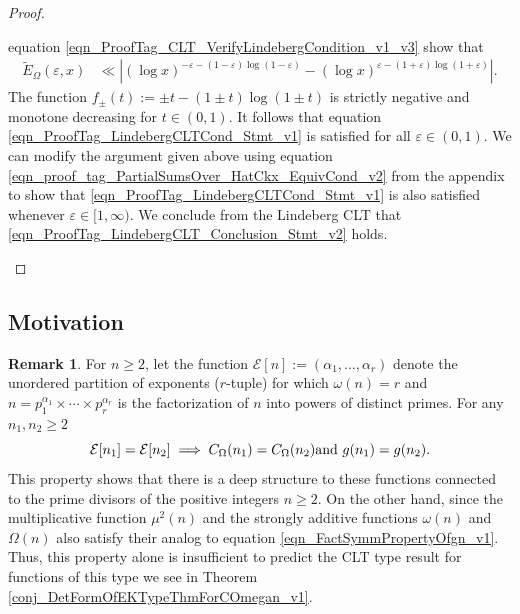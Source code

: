 \documentclass[11pt,reqno,a4letter]{article}
\newcommand{\hlocalref}[1]{\hyperref[#1]{\ref{#1}}}
\numberwithin{equation}{section}
\numberwithin{figure}{section}
\numberwithin{table}{section}
\theoremstyle{plain}
\numberwithin{theorem}{section}
\theoremstyle{definition}
\newtheorem{remark}[theorem]{Remark}
\theoremstyle{remark}
\newcommand{\mathtext}[1]{\text{\rm #1}}
\begin{document}
\begin{proof}
\begin{itemize}
equation \eqref{eqn_ProofTag_CLT_VerifyLindebergCondition_v1_v3} show that 
\begin{align*}
\widetilde{E}_{\Omega}(\varepsilon, x) & \ll 
      \left\lvert (\log x)^{-\varepsilon-(1-\varepsilon) \log(1-\varepsilon)} - 
      (\log x)^{\varepsilon-(1+\varepsilon) \log(1+\varepsilon)} \right\rvert. 
\end{align*}
The function $f_{\pm}(t) := \pm t - (1 \pm t) \log(1 \pm t)$ is strictly negative and 
monotone decreasing for $t \in (0, 1)$. 
It follows that equation \eqref{eqn_ProofTag_LindebergCLTCond_Stmt_v1} 
is satisfied for all $\varepsilon \in (0, 1)$. 
We can modify the argument given above using equation \eqref{eqn_proof_tag_PartialSumsOver_HatCkx_EquivCond_v2} 
from the appendix to show that 
\eqref{eqn_ProofTag_LindebergCLTCond_Stmt_v1} is also satisfied 
whenever $\varepsilon \in [1, \infty)$. 
We conclude from the Lindeberg CLT that 
\eqref{eqn_ProofTag_LindebergCLT_Conclusion_Stmt_v2} holds. 
\qedhere
\end{itemize}
\end{proof}

\subsection{Motivation}

\begin{remark}
\label{remark_COmegaFuncDistIntutitionFromErdosKac_v1}
For $n \geq 2$, let the function 
$\mathcal{E}[n] := (\alpha_1, \ldots, \alpha_r)$ denote the unordered 
partition of exponents ($r$-tuple) for which $\omega(n) = r$ and 
$n = p_1^{\alpha_1} \times \cdots \times p_r^{\alpha_r}$ is the factorization of 
$n$ into powers of distinct primes. 
For any $n_1,n_2 \geq 2$ 
\begin{equation}
\label{eqn_FactSymmPropertyOfgn_v1} 
\mathcal{E}[n_1] = \mathcal{E}[n_2] \implies C_{\Omega}(n_1) = C_{\Omega}(n_2) \mathtext{ and } 
	g(n_1) = g(n_2). 
\end{equation}
This property shows that there is a deep structure to these functions connected to the 
prime divisors of the positive integers $n \geq 2$. 
On the other hand, since the multiplicative function $\mu^2(n)$ and the 
strongly additive functions $\omega(n)$ and $\Omega(n)$ also satisfy their 
analog to equation \eqref{eqn_FactSymmPropertyOfgn_v1}. Thus, 
this property alone is insufficient to predict the CLT type 
result for functions of this type we see in 
Theorem \hlocalref{conj_DetFormOfEKTypeThmForCOmegan_v1}. 
\end{remark}
\end{document}
